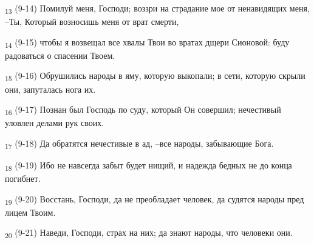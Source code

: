 \begin{tcolorbox}
\textsubscript{13} (9-14) Помилуй меня, Господи; воззри на страдание мое от ненавидящих меня, --Ты, Который возносишь меня от врат смерти,
\end{tcolorbox}
\begin{tcolorbox}
\textsubscript{14} (9-15) чтобы я возвещал все хвалы Твои во вратах дщери Сионовой: буду радоваться о спасении Твоем.
\end{tcolorbox}
\begin{tcolorbox}
\textsubscript{15} (9-16) Обрушились народы в яму, которую выкопали; в сети, которую скрыли они, запуталась нога их.
\end{tcolorbox}
\begin{tcolorbox}
\textsubscript{16} (9-17) Познан был Господь по суду, который Он совершил; нечестивый уловлен делами рук своих.
\end{tcolorbox}
\begin{tcolorbox}
\textsubscript{17} (9-18) Да обратятся нечестивые в ад, --все народы, забывающие Бога.
\end{tcolorbox}
\begin{tcolorbox}
\textsubscript{18} (9-19) Ибо не навсегда забыт будет нищий, и надежда бедных не до конца погибнет.
\end{tcolorbox}
\begin{tcolorbox}
\textsubscript{19} (9-20) Восстань, Господи, да не преобладает человек, да судятся народы пред лицем Твоим.
\end{tcolorbox}
\begin{tcolorbox}
\textsubscript{20} (9-21) Наведи, Господи, страх на них; да знают народы, что человеки они.
\end{tcolorbox}
